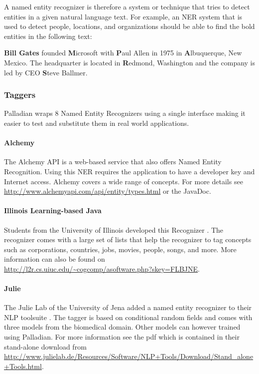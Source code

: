 \documentclass[a4paper,twoside]{book}      %
\begin{document}
A named entity recognizer is therefore a system or technique that tries to detect entities in a given natural language text. For example, an NER system that is used to detect people, locations, and organizations should be able to find the bold entities in the following text:

\textbf{Bill Gates} founded {\textbf Microsoft} with {\textbf Paul Allen} in 1975 in {\textbf Albuquerque, New Mexico}. The headquarter is located in {\textbf Redmond, Washington} and the company is led by CEO {\textbf Steve Ballmer}.

\subsubsection{Taggers}
Palladian wraps 8 Named Entity Recognizers using a single interface making it easier to test and substitute them in real world applications.

\paragraph{Alchemy} The Alchemy API is a web-based service that also offers Named Entity Recognition. Using this NER requires the application to have a developer key and Internet access. Alchemy covers a wide range of concepts. For more details see \url{http://www.alchemyapi.com/api/entity/types.html} or the JavaDoc.

\paragraph{Illinois Learning-based Java} Students from the University of Illinois developed this Recognizer \cite{illinoisccg}. The recognizer comes with a large set of lists that help the recognizer to tag concepts such as corporations, countries, jobs, movies, people, songs, and more. More information can also be found on \url{http://l2r.cs.uiuc.edu/~cogcomp/asoftware.php?skey=FLBJNE}.

\paragraph{Julie} The Julie Lab of the University of Jena added a named entity recognizer to their NLP toolsuite \cite{hahn2008overview}. The tagger is based on conditional random fields and comes with three models from the biomedical domain. Other models can however trained using Palladian. For more information see the pdf which is contained in their stand-alone download from \url{http://www.julielab.de/Resources/Software/NLP+Tools/Download/Stand_alone+Tools.html}.
\end{document}
